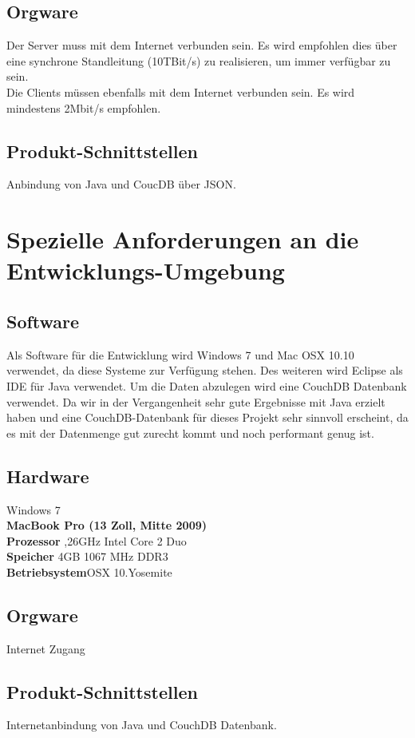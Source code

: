 \documentclass[a4paper,listof=leveldown,listof=numbered]{scrreprt}
\begin{document}
	\section{Orgware}
	Der Server muss mit dem Internet verbunden sein. Es wird empfohlen dies über eine synchrone Standleitung (10TBit/s) zu realisieren, um immer verfügbar zu sein.\\
	Die Clients müssen ebenfalls mit dem Internet verbunden sein. Es wird mindestens 2Mbit/s empfohlen.
	
	\section{Produkt-Schnittstellen}
	Anbindung von Java und CoucDB über JSON.
	
\chapter{Spezielle Anforderungen an die Entwicklungs-Umgebung}
	
	\section{Software}
	Als Software für die Entwicklung wird Windows 7 und Mac OSX 10.10 verwendet, da diese Systeme zur Verfügung stehen. Des weiteren wird Eclipse als IDE für Java verwendet. Um die Daten abzulegen wird eine CouchDB Datenbank verwendet.
	Da wir in der Vergangenheit sehr gute Ergebnisse mit Java erzielt haben und eine CouchDB-Datenbank für dieses Projekt sehr sinnvoll erscheint, da es mit der Datenmenge gut zurecht kommt und noch performant genug ist.
	\section{Hardware}
	Windows 7\\
	
	\textbf{	MacBook Pro (13 Zoll, Mitte 2009)}\\
	\textbf{Prozessor} 	,26GHz Intel Core 2 Duo\\
	\textbf{Speicher} 	\quad 4GB 1067 MHz DDR3\\
	\textbf{Betriebsystem}\quad OSX 10.Yosemite

	
	\section{Orgware}
	Internet Zugang
	
	\section{Produkt-Schnittstellen}
	Internetanbindung von Java und CouchDB Datenbank.
\end{document}
